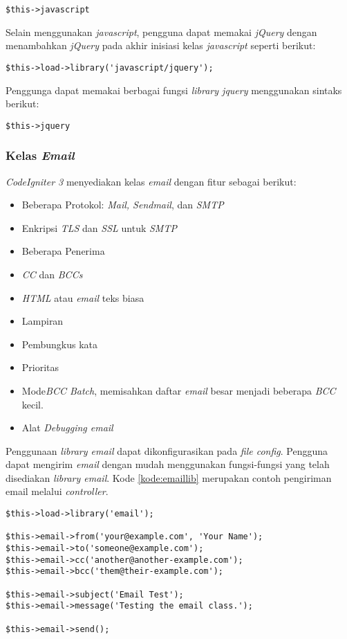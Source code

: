 \begin{center}
	\verb|$this->javascript|
\end{center}

Selain menggunakan \textit{javascript}, pengguna dapat memakai \textit{jQuery} dengan menambahkan \textit{jQuery} pada akhir inisiasi kelas \textit{javascript} seperti berikut:

\begin{center}
\verb|$this->load->library('javascript/jquery');|
\end{center}

Penggunga dapat memakai berbagai fungsi \textit{library jquery} menggunakan sintaks berikut:

\begin{center}
\verb|$this->jquery|
\end{center}

\subsubsection{Kelas \textit{Email}}
\textit{CodeIgniter 3} menyediakan kelas \textit{email} dengan fitur sebagai berikut:

\begin{itemize}
\item Beberapa Protokol: \textit{Mail, Sendmail}, dan \textit{SMTP}
\item Enkripsi \textit{TLS} dan \textit{SSL} untuk \textit{SMTP}
\item Beberapa Penerima
\item \textit{CC} dan \textit{BCCs}
\item \textit{HTML} atau \textit{email} teks biasa
\item Lampiran
\item Pembungkus kata
\item Prioritas
\item Mode\textit{BCC Batch}, memisahkan daftar \textit{email} besar menjadi beberapa \textit{BCC} kecil.
\item Alat \textit{Debugging email}
\end{itemize}

Penggunaan \textit{library email} dapat dikonfigurasikan pada \textit{file config}. Pengguna dapat mengirim \textit{email} dengan mudah menggunakan fungsi-fungsi yang telah disediakan \textit{library email}. Kode \ref{kode:emaillib} merupakan contoh pengiriman email melalui \textit{controller}.

\begin{lstlisting}[caption=Contoh pengiriman email melalui \textit{controller}, label=kode:emaillib]
$this->load->library('email');

$this->email->from('your@example.com', 'Your Name');
$this->email->to('someone@example.com');
$this->email->cc('another@another-example.com');
$this->email->bcc('them@their-example.com');

$this->email->subject('Email Test');
$this->email->message('Testing the email class.');

$this->email->send();
\end{lstlisting}

